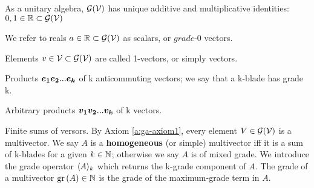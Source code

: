 \begin{definition}[Identities]
    As a unitary algebra, $\mathcal{G}(\mathcal{V})$ has unique additive and multiplicative identities: $0, 1 \in \mathbb{R} \subset \mathcal{G}(\mathcal{V})$
\end{definition}
\begin{definition}[Scalars]
    We refer to reals $a \in \mathbb{R} \subset \mathcal{G}(\mathcal{V})$ as scalars, or $\textit{grade-0}$ vectors.
\end{definition}
\begin{definition}[1-vectors]
    Elements $v \in \mathcal{V} \subset \mathcal{G}(\mathcal{V})$ are called 1-vectors, or simply vectors.
\end{definition}
\begin{definition}[k-blades]
    Products $\boldsymbol{e_1}\boldsymbol{e_2}...\boldsymbol{e_k}$ of k anticommuting vectors; we say that a k-blade has grade k.
\end{definition}
\begin{definition}[k-versors]
    Arbitrary products $\boldsymbol{v_1}\boldsymbol{v_2}...\boldsymbol{v_k}$ of k vectors.
\end{definition}
\begin{definition}[Multivectors]
	Finite sums of versors. By Axiom \ref{a:ga-axiom1}, every element $V \in \mathcal{G}(\mathcal{V})$ is a multivector. We say $A$ is a \textbf{homogeneous} (or simple) multivector iff it is a sum of k-blades for a given $k \in \mathbb{N}$; otherwise we say $A$ is of mixed grade.
		We introduce the grade operator $\langle A \rangle_{k}$ which returns the k-grade component of $A$.
		The grade of a multivector $\mathrm{gr}\left(A\right) \in \mathbb{N}$ is the grade of the maximum-grade term in $A$.
\end{definition}
